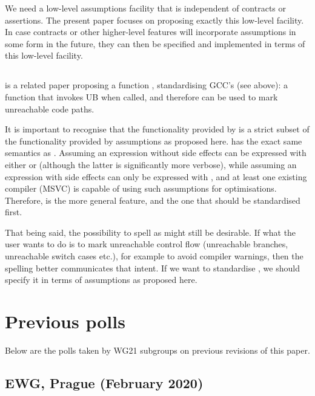 We need a low-level assumptions facility that is independent of contracts or assertions. The present paper focuses on proposing exactly this low-level facility. In case contracts or other higher-level features will incorporate assumptions in some form in the future, they can then be specified and implemented in terms of this low-level facility.

\subsection{}

\cite{P0627R6} is a related paper proposing a function , standardising GCC's  (see above): a function that invokes UB when called, and therefore can be used to mark unreachable code paths.

It is important to recognise that the functionality provided by  is a strict subset of the functionality provided by assumptions as proposed here.  has the exact same semantics as . Assuming an expression without side effects can be expressed with either  or  (although the latter is significantly more verbose), while assuming an expression with side effects can only be expressed with , and at least one existing compiler (MSVC) is capable of using such assumptions for optimisations. Therefore,  is the more general feature, and the one that should be standardised first.

That being said, the possibility to spell  as  might still be desirable. If 
what the user wants to do is to mark unreachable control flow (unreachable branches, unreachable switch cases etc.), for example to avoid compiler warnings, then the spelling  better communicates that intent. If we want to standardise , we should specify it in terms of assumptions as proposed here.

\section {Previous polls}

Below are the polls taken by WG21 subgroups on previous revisions of this paper.

\subsection{EWG, Prague (February 2020)}

